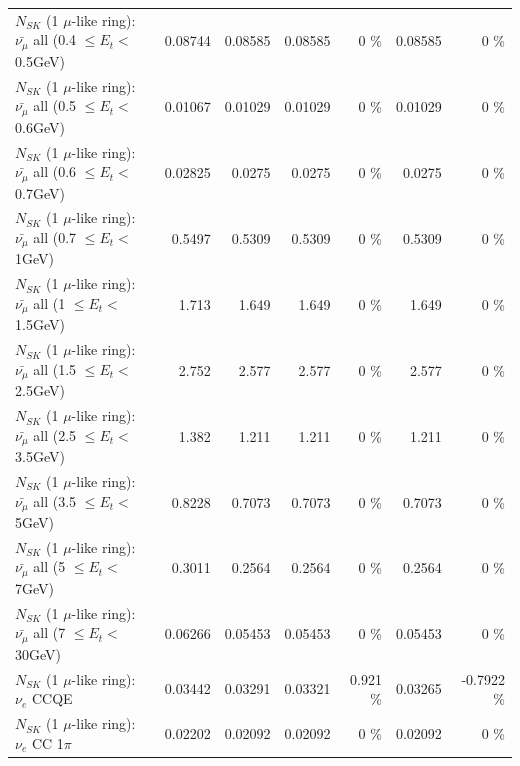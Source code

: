 \begin{table}
\begin{tabular}{| l | r | r | r  r | r  r |}
 $N_{SK}$ (1 $\mu$-like ring): $\bar{\nu_{\mu}}$ all (0.4 $\leq E_{t} <$ 0.5GeV) &         0.08744 &         0.08585 &         0.08585 &        0 \%  &         0.08585 &        0 \%  \\ 
 $N_{SK}$ (1 $\mu$-like ring): $\bar{\nu_{\mu}}$ all (0.5 $\leq E_{t} <$ 0.6GeV) &         0.01067 &         0.01029 &         0.01029 &        0 \%  &         0.01029 &        0 \%  \\ 
 $N_{SK}$ (1 $\mu$-like ring): $\bar{\nu_{\mu}}$ all (0.6 $\leq E_{t} <$ 0.7GeV) &         0.02825 &          0.0275 &          0.0275 &        0 \%  &          0.0275 &        0 \%  \\ 
   $N_{SK}$ (1 $\mu$-like ring): $\bar{\nu_{\mu}}$ all (0.7 $\leq E_{t} <$ 1GeV) &          0.5497 &          0.5309 &          0.5309 &        0 \%  &          0.5309 &        0 \%  \\ 
   $N_{SK}$ (1 $\mu$-like ring): $\bar{\nu_{\mu}}$ all (1 $\leq E_{t} <$ 1.5GeV) &           1.713 &           1.649 &           1.649 &        0 \%  &           1.649 &        0 \%  \\ 
 $N_{SK}$ (1 $\mu$-like ring): $\bar{\nu_{\mu}}$ all (1.5 $\leq E_{t} <$ 2.5GeV) &           2.752 &           2.577 &           2.577 &        0 \%  &           2.577 &        0 \%  \\ 
 $N_{SK}$ (1 $\mu$-like ring): $\bar{\nu_{\mu}}$ all (2.5 $\leq E_{t} <$ 3.5GeV) &           1.382 &           1.211 &           1.211 &        0 \%  &           1.211 &        0 \%  \\ 
   $N_{SK}$ (1 $\mu$-like ring): $\bar{\nu_{\mu}}$ all (3.5 $\leq E_{t} <$ 5GeV) &          0.8228 &          0.7073 &          0.7073 &        0 \%  &          0.7073 &        0 \%  \\ 
     $N_{SK}$ (1 $\mu$-like ring): $\bar{\nu_{\mu}}$ all (5 $\leq E_{t} <$ 7GeV) &          0.3011 &          0.2564 &          0.2564 &        0 \%  &          0.2564 &        0 \%  \\ 
    $N_{SK}$ (1 $\mu$-like ring): $\bar{\nu_{\mu}}$ all (7 $\leq E_{t} <$ 30GeV) &         0.06266 &         0.05453 &         0.05453 &        0 \%  &         0.05453 &        0 \%  \\ 
\hline
\hline
\hline
                                      $N_{SK}$ (1 $\mu$-like ring): $\nu_e$ CCQE &         0.03442 &         0.03291 &         0.03321 &    0.921 \%  &         0.03265 &  -0.7922 \%  \\ 
                                 $N_{SK}$ (1 $\mu$-like ring): $\nu_e$ CC 1$\pi$ &         0.02202 &         0.02092 &         0.02092 &        0 \%  &         0.02092 &        0 \%  \\ 

\end{tabular}
\end{table}
